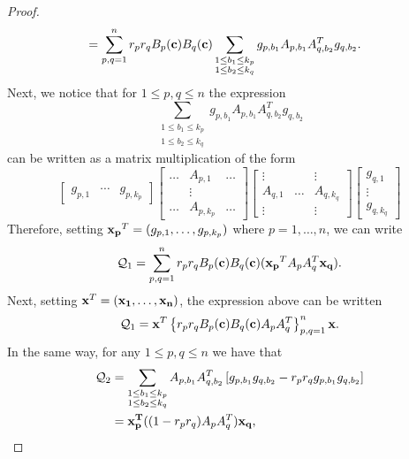\documentclass[9pt, a4paper]{amsart}
\newcommand{\1}{{\chi_{}}}%
\numberwithin{equation}{section}
\begin{document}
\begin{proof}
\begin{align*}
  &=\sum_{p,q=1}^{n} r_p r_q  B_{p}({\bf{c}}) B_{q}({\bf{c}})\sum_{\substack{1\leq b_1\leq k_p \\ 1\leq b_2\leq k_q}}  g_{p,b_1} A_{p,b_1}A_{q,b_2}^T g_{q,b_2}.
\end{align*}
Next, we notice that for $1\leq p,q\leq n$ the expression 
\begin{equation*}
\sum_{\substack{1\leq b_1\leq k_p \\ 1\leq b_2\leq k_q}} g_{p,b_1} A_{p,b_1}A_{q,b_2}^T g_{q,b_2}
\end{equation*}
can be written as a matrix multiplication of the form
\[
\begin{bmatrix} g_{p,1} & \cdots & g_{p,k_p}
\end{bmatrix} 
\begin{bmatrix}
\ldots & A_{p,1}&\ldots  \\
       & \vdots &  \\
	\ldots  &A_{p,k_p} & \ldots 
\end{bmatrix}
\begin{bmatrix}
\vdots&   &  \vdots\\
A_{q,1} & \dots & 	A_{q,k_q} \\
\vdots &  & \vdots 
\end{bmatrix}
\begin{bmatrix} g_{q,1} \\ \vdots \\ g_{q,k_q}
\end{bmatrix}
\]
Therefore, setting ${\bf{x}_p}^{T}=(g_{p,1},\ldots,g_{p,k_p})$ where $p=1,\ldots,n$, we can write 
\begin{align*}
\mathcal{Q}_1=\sum_{p,q=1}^{n} r_p r_q  B_{p}({\bf{c}}) B_{q}({\bf{c}})( {\bf{x}_p}^TA_{p}A_{q}^T {\bf{x}_q}).
\end{align*}
Next, setting ${\bf{x}}^{T}=({\bf{x}_1},
\ldots,{\bf{x}_n})$, the expression above can be written
\begin{align}\label{1strerm}
	\mathcal{Q}_1={\bf{x}}^T\left\{  r_p r_q  B_{p}({\bf{c}}) B_{q}({\bf{c}}) A_{p}A_{q}^T  \right\}_{p,q=1}^n{\bf{x}}.
\end{align}
In the same way, for any $1\leq p,q\leq n$ we have that
\begin{align*}
\mathcal{Q}_2&=\sum_{\substack{1\leq b_1\leq k_p \\ 1\leq b_2\leq k_q}}  A_{p,b_1}A_{q,b_2}^T   \left[g_{p,b_1}  g_{q,b_2}  -  r_p r_q g_{p,b_1} g_{q,b_2}  \right]\\
	&={\bf{x}_p^T}((1-r_pr_q) A_{p}A_{q}^T){\bf{x}_q},
\end{align*}

\end{proof}
\end{document}
